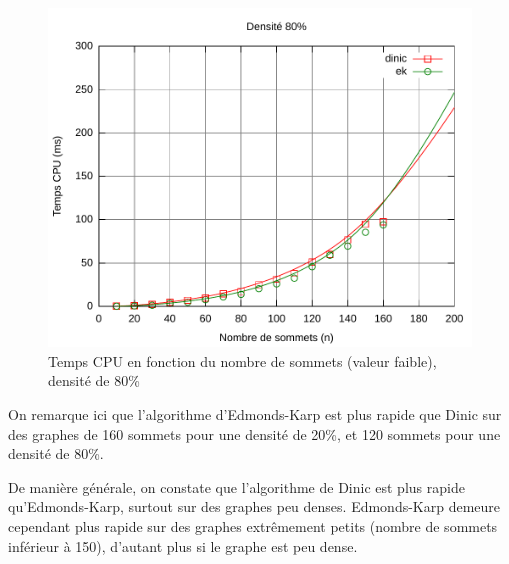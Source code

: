 \begin{figure}[h!]
\begin{center}
\includegraphics[width=\textwidth]{files/c80_low}
\end{center}
\caption{Temps CPU en fonction du nombre de sommets (valeur faible), densité de 80\%}
\end{figure}

On remarque ici que l'algorithme d'Edmonds-Karp est plus rapide que Dinic sur des graphes de 160 sommets pour une densité de 20\%, et 120 sommets pour une densité de 80\%.

De manière générale, on constate que l'algorithme de Dinic est plus rapide qu'Edmonds-Karp, surtout sur des graphes peu denses. Edmonds-Karp demeure cependant plus rapide sur des graphes extrêmement petits (nombre de sommets inférieur à 150), d'autant plus si le graphe est peu dense.